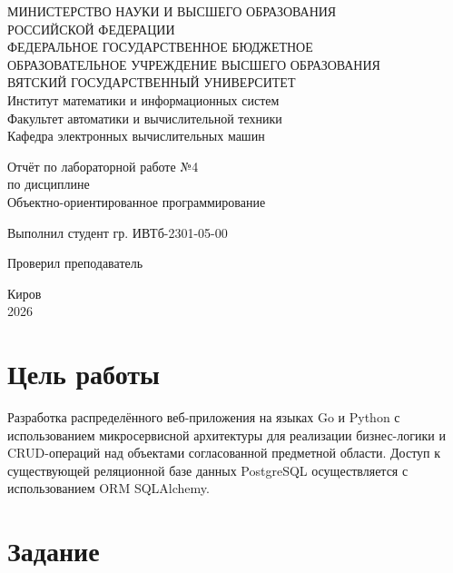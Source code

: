 \documentclass[oneside,a4paper,14pt]{extarticle}
\begin{document}
\newpage\thispagestyle{empty}
\begin{center}
    МИНИСТЕРСТВО НАУКИ И ВЫСШЕГО ОБРАЗОВАНИЯ\\
    РОССИЙСКОЙ ФЕДЕРАЦИИ\\
    ФЕДЕРАЛЬНОЕ ГОСУДАРСТВЕННОЕ БЮДЖЕТНОЕ\\
    ОБРАЗОВАТЕЛЬНОЕ УЧРЕЖДЕНИЕ ВЫСШЕГО ОБРАЗОВАНИЯ\\
    ВЯТСКИЙ ГОСУДАРСТВЕННЫЙ УНИВЕРСИТЕТ\\
    Институт математики и информационных систем\\
    Факультет автоматики и вычислительной техники\\
    Кафедра электронных вычислительных машин
\end{center}

\vspace{20mm}
\begin{center}

    Отчёт по лабораторной работе №4\\
    по дисциплине\\
    Объектно-ориентированное программирование\\
\end{center}
\vfill

Выполнил студент гр. ИВТб-2301-05-00 \hfill
{}

Проверил преподаватель\hfill
{}

\vfill
\begin{center}
    Киров\\
    2026
\end{center}

\newpage

\section*{Цель работы}
Разработка распределённого веб-приложения на языках Go и Python с использованием микросервисной архитектуры для реализации бизнес-логики и CRUD-операций над объектами согласованной предметной области. Доступ к существующей реляционной базе данных PostgreSQL осуществляется с использованием ORM SQLAlchemy.

\section*{Задание}
\end{document}

